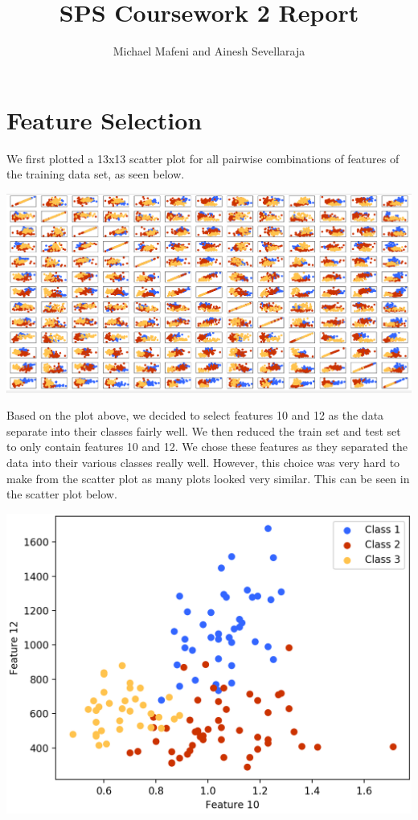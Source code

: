\documentclass[11pt]{article}
\begin{document}
\title{SPS Coursework 2 Report}
\author{Michael Mafeni and Ainesh Sevellaraja}
\date{}
\maketitle

\section{Feature Selection}
We first plotted a 13x13 scatter plot for all pairwise combinations of features of the training data set, as seen below.

\begin{center}
\includegraphics[scale=0.25]{feature_selection}
\end{center}

Based on the plot above, we decided to select features 10 and 12 as the data separate into their classes fairly well. We then reduced the train set and test set to only contain features 10 and 12. We chose these features as they separated the data into their various classes really well. However, this choice was very hard to make from the scatter plot as many plots looked very similar. This can be seen in the scatter plot below.

\begin{center}
\includegraphics[scale=0.3]{features_10_12}
\end{center}
\end{document}
